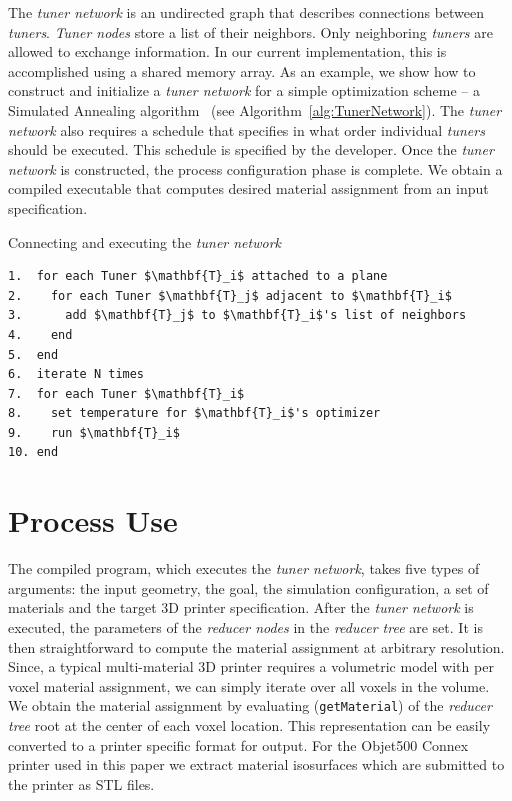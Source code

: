 The \emph{tuner network} is an undirected graph that describes connections between \emph{tuners}.
\emph{Tuner nodes} store a list of their neighbors.
Only neighboring \emph{tuners} are allowed to exchange information.
In our current implementation, this is accomplished using a shared memory array.
As an example, we show how to construct and initialize a \emph{tuner network} for a simple optimization scheme --
a Simulated Annealing algorithm~\cite{Van:1987} (see Algorithm~\ref{alg:TunerNetwork}).
The \emph{tuner network} also requires a schedule that specifies in what order individual \emph{tuners} should be executed.
This schedule is specified by the developer. Once the \emph{tuner network} is constructed,
the process configuration phase is complete.
We obtain a compiled executable that computes desired material assignment from an input specification.
\begin{algorithm}
\caption{Connecting and executing the \emph{tuner network}}
\label{alg:TunerNetwork}
\begin{lstlisting}[mathescape=true]
1.  for each Tuner $\mathbf{T}_i$ attached to a plane
2.    for each Tuner $\mathbf{T}_j$ adjacent to $\mathbf{T}_i$
3.      add $\mathbf{T}_j$ to $\mathbf{T}_i$'s list of neighbors
4.    end
5.  end
6.  iterate N times
7.  for each Tuner $\mathbf{T}_i$
8.    set temperature for $\mathbf{T}_i$'s optimizer
9.    run $\mathbf{T}_i$
10. end
\end{lstlisting}
\end{algorithm} 
\section{Process Use}
\label{sec:use}
The compiled program, which executes the \emph{tuner network}, takes five types of arguments: the input geometry, the goal, the simulation configuration, a set of materials and the target 3D printer specification. 
After the \emph{tuner network} is executed, the parameters of the \emph{reducer nodes} in the \emph{reducer tree} are set. It is then straightforward to compute the material assignment at arbitrary resolution. Since, a typical multi-material 3D printer requires a volumetric model with per voxel material assignment, we can simply iterate over all voxels in the volume. We obtain the material assignment by evaluating (\verb|getMaterial|) of the \emph{reducer tree} root at the center of each voxel location. This representation can be easily converted to a printer specific format for output. For the Objet500 Connex printer used in this paper we extract material isosurfaces which are submitted to the printer as STL files. 
